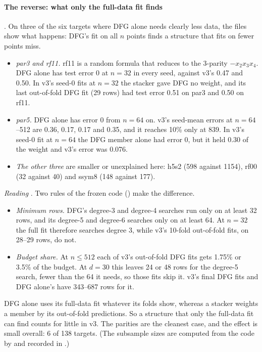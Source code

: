 \paragraph{The reverse: what only the full-data fit finds} . On three of the six targets where DFG alone needs clearly less data, the files show what happens: DFG's fit on all $n$ points finds a structure that fits on fewer points miss.
\begin{itemize}
\item \emph{par3 and rf11.} rf11 is a random formula that reduces to the 3-parity $-x_2x_3x_4$. DFG alone has test error 0 at $n=32$ in every seed, against v3's 0.47 and 0.50. In v3's seed-0 fits at $n=32$ the stacker gave DFG no weight, and its last out-of-fold DFG fit (29 rows) had test error 0.51 on par3 and 0.50 on rf11.
\item \emph{par5.} DFG alone has error 0 from $n=64$ on. v3's seed-mean errors at $n=64$--512 are 0.36, 0.17, 0.17 and 0.35, and it reaches 10\% only at 839. In v3's seed-0 fit at $n=64$ the DFG member alone had error 0, but it held 0.30 of the weight and v3's error was 0.076.
\item \emph{The other three} are smaller or unexplained here: h5s2 (598 against 1154), rf00 (32 against 40) and ssym8 (148 against 177).
\end{itemize}
\emph{Reading} . Two rules of the frozen code () make the difference.
\begin{itemize}
\item \emph{Minimum rows.} DFG's degree-3 and degree-4 searches run only on at least 32 rows, and its degree-5 and degree-6 searches only on at least 64. At $n=32$ the full fit therefore searches degree 3, while v3's 10-fold out-of-fold fits, on 28--29 rows, do not.
\item \emph{Budget share.} At $n\le512$ each of v3's out-of-fold DFG fits gets 1.75\% or 3.5\% of the budget. At $d=30$ this leaves 24 or 48 rows for the degree-5 search, fewer than the 64 it needs, so those fits skip it. v3's final DFG fits and DFG alone's have 343--687 rows for it.
\end{itemize}
DFG alone uses its full-data fit whatever its folds show, whereas a stacker weights a member by its out-of-fold predictions. So a structure that only the full-data fit can find counts for little in v3. The parities are the cleanest case, and the effect is small overall: 6 of 138 targets. (The subsample sizes are computed from the code by  and recorded in .)

